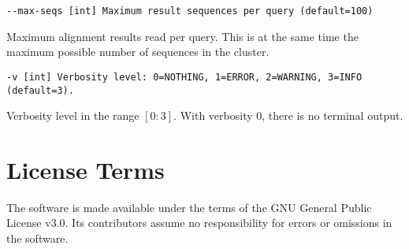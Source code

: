 \documentclass[11pt,a4paper]{scrreprt}
\begin{document}
\texttt{\small -{}-max-seqs {[}int{]} Maximum result sequences per query (default=100)}{\small \par}

Maximum alignment results read per query. This is at the same time the maximum possible number of sequences in the cluster.

\texttt{\small -v {[}int{]} Verbosity level: 0=NOTHING, 1=ERROR, 2=WARNING, 3=INFO (default=3).}{\small \par}

Verbosity level in the range $[0:3]$. With verbosity $0$, there is no terminal output.


\section{License Terms}
The software is made available under the terms of the GNU General Public License v3.0. Its contributors assume no responsibility for errors or omissions in the software.
\end{document}
